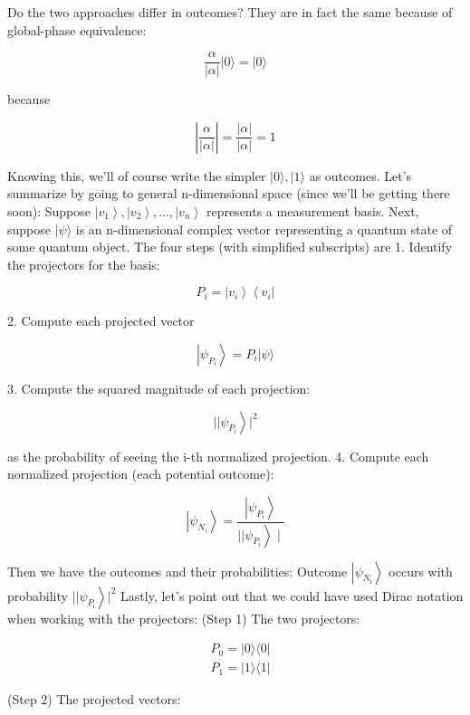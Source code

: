 \documentclass[main.tex]{subfiles}
\begin{document}
    Do the two approaches differ in outcomes? They are in fact the same because of global-phase equivalence:
    
    $$
    \frac{\alpha}{|\alpha|}|0\rangle=|0\rangle
    $$
    
    because
    
    $$
    \left|\frac{\alpha}{|\alpha|}\right|=\frac{|\alpha|}{|\alpha|}=1
    $$
    
    Knowing this, we'll of course write the simpler $|0\rangle,|1\rangle$ as outcomes. Let's summarize by going to general n-dimensional space (since we'll be getting there soon): Suppose $\left|v_{1}\right\rangle,\left|v_{2}\right\rangle, \ldots,\left|v_{n}\right\rangle$ represents a measurement basis. Next, suppose $|\psi\rangle$ is an n-dimensional complex vector representing a quantum state of some quantum object. The four steps (with simplified subscripts) are 1. Identify the projectors for the basis:
    
    $$
    P_{i}=\left|v_{i}\right\rangle\left\langle v_{i}\right|
    $$
    
    2. Compute each projected vector
    
    $$
    \left|\psi_{P_{i}}\right\rangle=P_{i}|\psi\rangle
    $$
    
    3. Compute the squared magnitude of each projection:
    
    $$
    \left.|| \psi_{P_{i}}\right\rangle\left.\right|^{2}
    $$
    
    as the probability of seeing the i-th normalized projection. 4. Compute each normalized projection (each potential outcome):
    
    $$
    \left|\psi_{N_{i}}\right\rangle=\frac{\left|\psi_{P_{i}}\right\rangle}{\left.|| \psi_{P_{i}}\right\rangle \mid}
    $$
    
    Then we have the outcomes and their probabilities: Outcome $\left|\psi_{N_{\mathrm{i}}}\right\rangle$ occurs with probability ||$\left.\psi_{P_{\mathrm{i}}}\right\rangle\left.\right|^{2}$ Lastly, let's point out that we could have used Dirac notation when working with the projectors: (Step 1) The two projectors:
    
    $$
    \begin{aligned}
    &P_{0}=|0\rangle\langle 0| \\
    &P_{1}=|1\rangle\langle 1|
    \end{aligned}
    $$
    
    (Step 2) The projected vectors:
    
\end{document}
